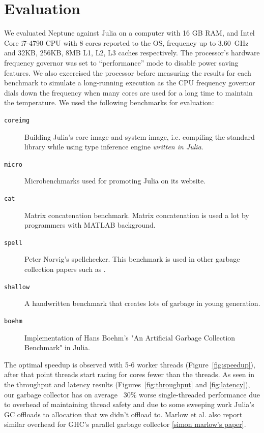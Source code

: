 \section{Evaluation} \label{evaluation}

We evaluated Neptune against Julia on a computer with 16 GB RAM, and Intel Core i7-4790 CPU with 8 cores reported to the OS, frequency up to $3.60$~GHz and 32KB, 256KB, 8MB L1, L2, L3 caches respectively. The processor's hardware frequency governor was set to ``performance'' mode to disable power saving features. We also excercised the processor before measuring the results for each benchmark to simulate a long-running execution as the CPU frequency governor dials down the frequency when many cores are used for a long time to maintain the temperature. We used the following benchmarks for evaluation:

\begin{description}
\item[\texttt{coreimg}] Building Julia's core image and system image, i.e. compiling the standard library while using type inference engine \emph{written in Julia}.
\item[\texttt{micro}] Microbenchmarks used for promoting Julia on its website.
\item[\texttt{cat}] Matrix concatenation benchmark. Matrix concatenation is used a lot by programmers with MATLAB background.
\item[\texttt{spell}] Peter Norvig's spellchecker. This benchmark is used in other garbage collection papers such as \cite{simon marlow's paper}.
\item[\texttt{shallow}] A handwritten benchmark that creates lots of garbage in young generation.
\item[\texttt{boehm}] Implementation of Hans Boehm's "An Artificial Garbage Collection Benchmark" in Julia.
\end{description}

The optimal speedup is observed with 5-6 worker threads (Figure~\ref{fig:speedup}), after that point threads start racing for cores fewer than the threads. As seen in the throughput and latency results (Figures~\ref{fig:throughput} and \ref{fig:latency}), our garbage collector has on average ~30\% worse single-threaded performance due to overhead of maintaining thread safety and due to some sweeping work Julia's GC offloads to allocation that we didn't offload to. Marlow et al. also report similar overhead for GHC's parallel garbage collector \ref{simon marlow's paper}.

